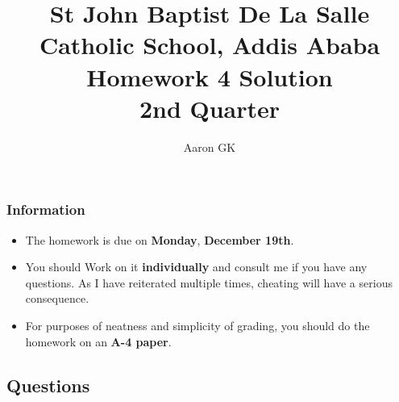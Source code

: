 \documentclass[9pt,addpoints]{exam}
\author{Aaron GK}
\begin{document}
	\title{St John Baptist De La Salle Catholic School, Addis Ababa\\
		\large Homework 4 Solution\\
		2nd Quarter}
	\maketitle
	\begin{center}
		\subsubsection*{Information}
		\begin{itemize}
			\item The homework is due on \textbf{Monday}, \textbf{December 19th}.
			\item You should Work on it \textbf{individually} and consult me if you have any questions. As I have reiterated multiple times, cheating will have a serious consequence.
			\item For purposes of neatness and simplicity of grading, you should do the homework on an \textbf{A-4 paper}.
		\end{itemize}
	\end{center}
	\begin{center}
		\subsection*{Questions}
	\end{center}
	
\end{document}
